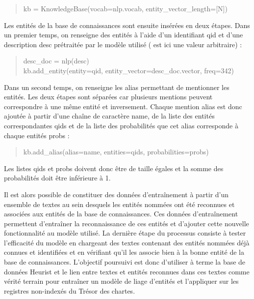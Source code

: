 \documentclass[a4paper,12pt,twoside]{book}
\begin{document}
	\begin{quotation}
		kb = KnowledgeBase(vocab=nlp.vocab, entity\_vector\_length=[N])
	\end{quotation}
	
	Les entités de la base de connaissances sont ensuite insérées en deux étapes. Dans un premier temps, on renseigne des entités à l'aide d'un identifiant \og qid\fg{} et d'une description \og desc\fg{} prétraitée par le modèle utilisé (\fg{} est ici une valeur arbitraire) :
	
	\begin{quotation}
			desc\_doc = nlp(desc)\\
			\indent kb.add\_entity(entity=qid, entity\_vector=desc\_doc.vector, freq=342)
	\end{quotation}
	
	Dans un second temps, on renseigne les alias permettant de mentionner les entités. Les deux étapes sont séparées car plusieurs mentions peuvent correspondre à une même entité et inversement. Chaque mention \og alias\fg{} est donc ajoutée à partir d'une chaîne de caractère \og name\fg{}, de la liste des entités correspondantes \og qids\fg{} et de la liste des probabilités que cet alias corresponde à chaque entités \og probs\fg{} :
	
	\begin{quotation}
		kb.add\_alias(alias=name, entities=qids, probabilities=probs)
	\end{quotation}
	
	\noindent Les listes \og qids\fg{} et \og probs\fg{} doivent donc être de taille égales et la somme des probabilités doit être inférieure à 1.
	
	Il est alors possible de constituer des données d'entraînement à partir d'un ensemble de textes au sein desquels les entités nommées ont été reconnues et associées aux entités de la base de connaissances. Ces données d'entraînement permettent d'entraîner la reconnaissance de ces entités et d'ajouter cette nouvelle fonctionnalité au modèle utilisé. La dernière étape du processus consiste à tester l'efficacité du modèle en chargeant des textes contenant des entités nommées déjà connues et identifiées et en vérifiant qu'il les associe bien à la bonne entité de la base de connaissances. L'objectif poursuivi est donc d'utiliser à terme la base de données Heurist et le lien entre textes et entités reconnues dans ces textes comme vérité terrain pour entraîner un modèle de liage d'entités et l'appliquer sur les registres non-indexés du Trésor des chartes.
	
\end{document}
